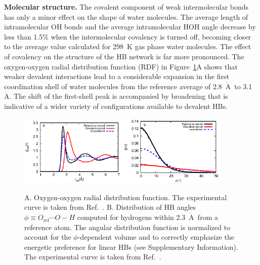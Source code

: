 \documentclass[10pt,amsmath,twocolumn,aps,prl,superscriptaddress,floatfix]{revtex4-1}
\newcommand{\Ang}{\ensuremath{\mathring{\text{A}}}}
\begin{document}
\textbf{Molecular structure.} The covalent component of weak intermolecular bonds has only a minor effect on the shape of water molecules. 
%
The average length of intramolecular OH bonds and the average intramolecular HOH angle decrease by less than 1.5\% when the intermolecular covalency is turned off, becoming closer to the average value calculated for 298~K gas phase water molecules. 
The effect of covalency on the structure of the HB network is far more pronounced. 
The oxygen-oxygen radial distribution function (RDF) in Figure~\ref{Fig:RDF}A shows that weaker devalent interactions lead to a considerable expansion in the first coordination shell of water molecules from the reference average of 2.8~\Ang\ to 3.1~\Ang. 
The shift of the first-shell peak is accompanied by broadening that is indicative of a wider variety of configurations available to devalent HBs.

\begin{figure}
\includegraphics[width=0.45\textwidth]{new_rdf}
\includegraphics[width=0.45\textwidth]{new_adf}
\caption{A. Oxygen-oxygen radial distribution function. The experimental curve is taken from Ref.~. B. Distribution of HB angles $\phi \equiv O_{\text{ref}} \cdots O-H$ computed for hydrogens within 2.3~\Ang\ from a reference atom. The angular distribution function is normalized to account for the $\phi$-dependent volume and to correctly emphasize the energetic preference for linear HBs (see Supplementary Information). The experimental curve is taken from Ref.~.} \label{Fig:RDF}
\end{figure}
\end{document}
